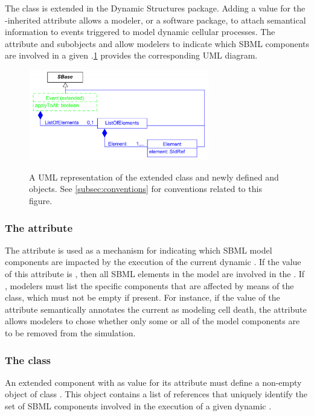 The \Event class is extended in the Dynamic Structures package. Adding a value for the \SBase-inherited  attribute allows a modeler, or a software package, to attach semantical information to events triggered to model dynamic cellular processes. The  attribute and subobjects \ListOfElements and \Element allow modelers to indicate which SBML components are involved in a given \Event.\ref{fig:UMLExtendedEvent} provides the corresponding UML diagram. 

\begin{figure}[tbhp]
  \centering
  \includegraphics[width=0.70\textwidth]{images/UMLExtendedEvent.pdf}\\
  \caption{A UML representation of the extended \Event class and newly defined \ListOfElements and \Element objects. See \ref{subsec:conventions} for conventions related to this figure.} \label{fig:UMLExtendedEvent}
\end{figure}

\subsubsection{The  attribute}
\label{attr:applyToAll}
The  attribute is used as a mechanism for indicating which SBML model components are impacted by the execution of the current dynamic \Event. If the value of this attribute is , then all SBML elements in the model are involved in the \Event. If , modelers must list the specific components that are affected by means of the \ListOfElements class, which must not be empty if present. For instance, if the value of the  attribute semantically annotates the current \Event as modeling cell death, the  attribute allows modelers to chose whether only some or all of the model components are to be removed from the simulation. 

\subsubsection{The  class}
\label{subsec:ListOfElements}
An extended \Event component with  as value for its  attribute must define a non-empty object of class \ListOfElements. This object contains a list of \Element references that uniquely identify the set of SBML components involved in the execution of a given dynamic \Event.

